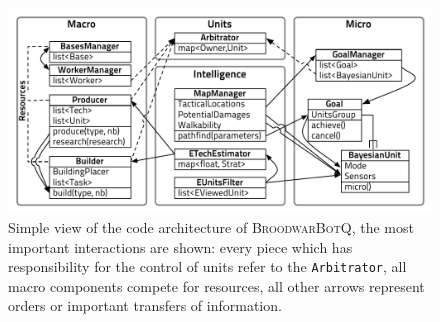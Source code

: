 \begin{figure}[h]
\begin{center}
\includegraphics[width=16cm]{images/BBQEarly2012.pdf}
\caption{Simple view of the code architecture of \textsc{BroodwarBotQ}, the most important interactions are shown: every piece which has responsibility for the control of units refer to the \texttt{Arbitrator}, all macro components compete for resources, all other arrows represent orders or important transfers of information.}
\label{fig:codearchitecture}
\end{center}
\end{figure}


